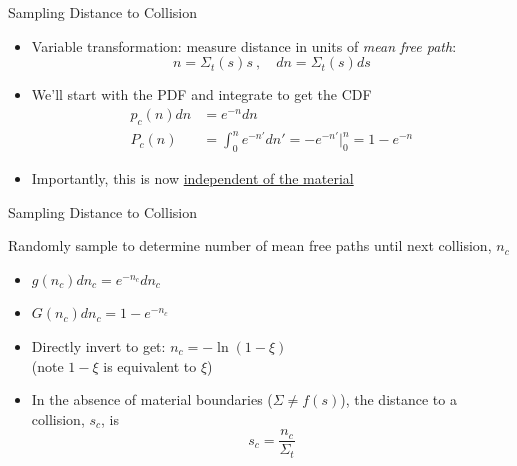 \documentclass[xcolor=x11names,compress]{beamer}
\renewcommand{\(}{\begin{columns}}
\renewcommand{\)}{\end{columns}}
\newcommand{\<}[1]{\begin{column}{#1}}
\renewcommand{\>}{\end{column}}
\begin{document}
\begin{frame}{Sampling Distance to Collision}

\begin{itemize}
  \item Variable transformation: measure distance in units of \textit{mean free path}:
  \[n = \Sigma_t(s)s\:,\quad dn = \Sigma_t(s)ds\]
  \item We'll start with the PDF and integrate to get the CDF
 \begin{align*}
    p_c(n)dn &= e^{-n} dn\\
    P_c(n) &= \int_0^n e^{-n'}dn' = -e^{-n'} |_0^n = 1 - e^{-n}
  \end{align*}
  \item Importantly, this is now \underline{independent of the material}
\end{itemize} 

\end{frame}


\begin{frame}{Sampling Distance to Collision}

Randomly sample to determine number of mean free paths until next collision, $n_c$

\begin{itemize}
  \item $g(n_c) dn_c = e^{-n_c} dn_c$ 
  \vspace{.5em}
  \item $G(n_c) dn_c = 1 - e^{-n_c}$ 
  \vspace{.5em}
  \item Directly invert to get: $\boxed{n_c = - \ln(1 - \xi)}$ \\
   \hspace*{1.5em} (note $1-\xi$ is equivalent to $\xi$)
  \vspace{.5em}
  \item In the absence of material boundaries ($\Sigma \neq f(s)$), the distance to a collision, $s_c$, is
  \[s_c = \frac{n_c}{\Sigma_t}\]
\end{itemize}

\end{frame}
\end{document}
